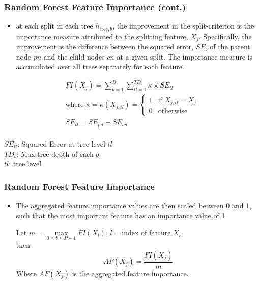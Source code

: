 \begin{frame}\frametitle{Random Forest Feature Importance (cont.)}         
	\begin{itemize}
	\item at each split in each tree $h_{\text{tree},b}$, the improvement in the split-criterion is the importance measure attributed to the splitting feature, $X_{j}$. Specifically, the improvement is the difference between the squared error, $SE$, of the parent node $pn$ and the child nodes $cn$ at a given split. The importance measure is accumulated over all trees separately for each feature.
	\end{itemize}
		 \begin{equation}
		 \begin{aligned}\label{eq:rf1}
                            FI(X_{j})= \sum_{b=1}^B \sum_{tl=1}^{TD_{b}} \kappa \times SE_{tl}\\
                            \text{where } \kappa=\kappa(X_{j,tl})=\begin{cases}
                            1 & \text{if $X_{j,tl}=X_{j}$}\\
                            0 & \text{otherwise}
                            \end{cases}\\
                            SE_{tl}=SE_{pn}-SE_{cn}\\
                 \end{aligned}
		\end{equation}
		\bigskip

\hspace{3cm}$SE_{tl}$: Squared Error at tree level $tl$ \\
\hspace{3cm}$TD_{b}$: Max tree depth of each $b$ \\		
\hspace{3cm}$tl$: tree level \\
                         
\end{frame}


\begin{frame}\frametitle{Random Forest Feature Importance }
	\begin{itemize}
		\item The aggregated feature importance values are then scaled between 0 and 1, such that the most important feature has an importance value of 1. \newline
		
		Let $m=\max\limits_{0 \leq l \leq P-1}FI(X_{l})$, $l=\text{index of feature } X_{l}$,\\
		then
	\begin{equation}
                          AF(X_{j}) = \frac{FI(X_{j})}{m}
	\end{equation}
	Where $AF(X_{j})$ is the aggregated feature importance.
	\end{itemize}
\end{frame}
